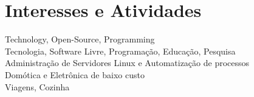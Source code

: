 \documentclass[a4paper,10pt]{article}
\begin{document}
\section{Interesses e Atividades}
Technology, Open-Source, Programming\\
Tecnologia, Software Livre, Programação, Educação, Pesquisa \\
Administração de Servidores Linux e Automatização de processos \\
Domótica e Eletrônica de baixo custo \\
Viagens, Cozinha

\vfill
\hrulefill\\
\center{\footnotesize{\today}}
\end{document}
